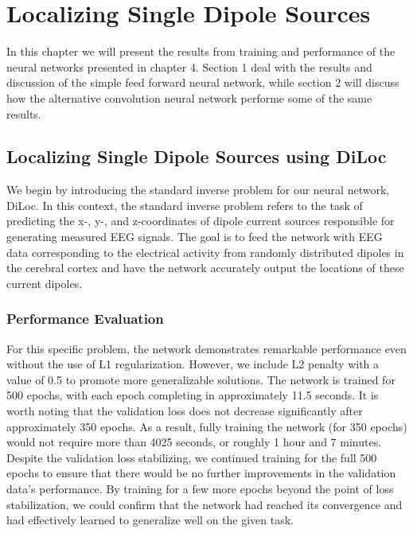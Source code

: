\documentclass[a4paper, UKenglish, 11pt]{uiomaster}
\begin{document}
\chapter{Localizing Single Dipole Sources}

In this chapter we will present the results from training and performance of the neural networks presented in chapter 4. Section 1 deal with the results and discussion of the simple feed forward neural network, while section 2 will discuss how the alternative convolution neural network performe some of the same results.

\section{Localizing Single Dipole Sources using DiLoc}

We begin by introducing the standard inverse problem for our neural network, DiLoc. In this context, the standard inverse problem refers to the task of predicting the x-, y-, and z-coordinates of dipole current sources responsible for generating measured EEG signals. The goal is to feed the network with EEG data corresponding to the electrical activity from randomly distributed dipoles in the cerebral cortex and have the network accurately output the locations of these current dipoles.

\subsection{Performance Evaluation}
For this specific problem, the network demonstrates remarkable performance even without the use of L1 regularization. However, we include L2 penalty with a value of 0.5 to promote more generalizable solutions. The network is trained for 500 epochs, with each epoch completing in approximately 11.5 seconds. It is worth noting that the validation loss does not decrease significantly after approximately 350 epochs. As a result, fully training the network (for 350 epochs) would not require more than 4025 seconds, or roughly 1 hour and 7 minutes. Despite the validation loss stabilizing, we continued training for the full 500 epochs to ensure that there would be no further improvements in the validation data's performance. By training for a few more epochs beyond the point of loss stabilization, we could confirm that the network had reached its convergence and had effectively learned to generalize well on the given task.
\end{document}
